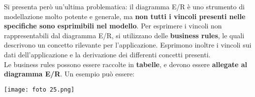 \documentclass{article}
\begin{document}
Si presenta però un'ultima problematica: il diagramma E/R è uno strumento di modellazione molto potente e generale, ma \textbf{non tutti i vincoli presenti nelle specifiche sono esprimibili nel modello}. Per esprimere i vincoli non rappresentabili dal diagramma E/R, si utilizzano delle \textbf{business rules}, le quali descrivono un concetto rilevante per l'applicazione. Esprimono inoltre i vincoli sui dati dell'applicazione e la derivazione dei differenti concetti presenti.\\
Le business rules possono essere raccolte in \textbf{tabelle}, e devono essere \textbf{allegate al diagramma E/R}. Un esempio può essere:
\begin{center}
    \texttt{[image: foto 25.png]}
\end{center}
\end{document}
